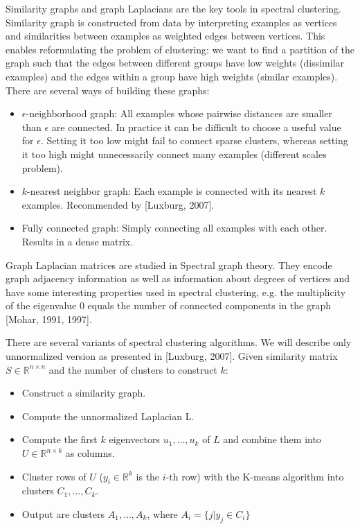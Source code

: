 \documentclass[conference]{IEEEtran}
\begin{document}
Similarity graphs and graph Laplacians are the key tools in spectral clustering.
Similarity graph is constructed from data by interpreting examples as vertices and similarities
between examples as weighted edges between vertices. This enables reformulating the problem
of clustering: we want to find a partition of the graph such that the edges between different groups
have low weights (dissimilar examples) and the edges within a group have high weights (similar examples).
There are several ways of building these graphs:
\begin{itemize}
    \item $\epsilon$-neighborhood graph: All examples whose pairwise distances are smaller than $\epsilon$
    are connected. In practice it can be difficult to choose a useful value for $\epsilon$. Setting it too
    low might fail to connect sparse clusters, whereas setting it too high might unnecessarily connect many
    examples (different scales problem).
    \item $k$-nearest neighbor graph: Each example is connected with its nearest $k$ examples. Recommended
    by [Luxburg, 2007].
    \item Fully connected graph: Simply connecting all examples with each other. Results in a dense matrix.
\end{itemize}


Graph Laplacian matrices are studied in Spectral graph theory. They encode graph adjacency information
as well as information about degrees of vertices and have some interesting properties used in spectral
clustering, e.g. the multiplicity of the eigenvalue 0 equals the number of connected components in the graph
[Mohar, 1991, 1997].

There are several variants of spectral clustering algorithms. We will describe only unnormalized version
as presented in [Luxburg, 2007]. Given similarity matrix $S \in \mathbb{R}^{n \times n}$ and the number
of clusters to construct $k$:


\begin{itemize}
    \item Construct a similarity graph.
    \item Compute the unnormalized Laplacian L.
    \item Compute the first $k$ eigenvectors $u_1, \dots, u_k$ of $L$ and combine them into
    $U \in \mathbb{R}^{n \times k}$ as columns.
    \item Cluster rows of $U$ ($y_i \in \mathbb{R}^k$ is the $i$-th row) with the K-means algorithm
    into clusters $C_1, \dots, C_k$.
    \item Output are clusters $A_1, \dots, A_k$, where $A_i = \{ j|y_j \in C_i \}$
\end{itemize}
\end{document}
